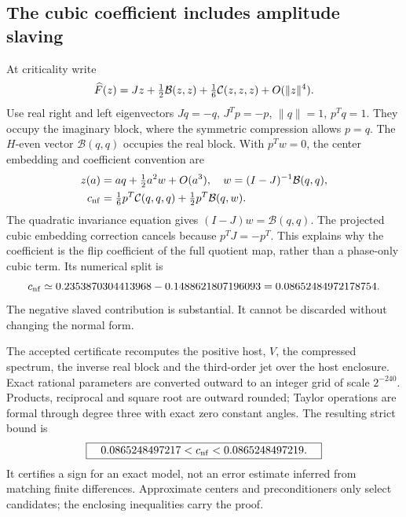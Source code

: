 \documentclass[11pt,a4paper]{article}
\begin{document}
\subsection{The cubic coefficient includes amplitude slaving}
At criticality write
\begin{equation}
 \widehat F(z)=Jz+\tfrac12\mathcal B(z,z)+\tfrac16\mathcal C(z,z,z)+O(\|z\|^4).
\end{equation}
Use real right and left eigenvectors $Jq=-q$, $J^Tp=-p$, $\|q\|=1$, $p^Tq=1$. They occupy the imaginary block, where the symmetric compression allows $p=q$. The $H$-even vector $\mathcal B(q,q)$ occupies the real block. With $p^Tw=0$, the center embedding and coefficient convention are
\begin{align}
 z(a)&=aq+\tfrac12a^2w+O(a^3),\quad w=(I-J)^{-1}\mathcal B(q,q),\\
 c_{\rm nf}&=\tfrac16p^T\mathcal C(q,q,q)+\tfrac12p^T\mathcal B(q,w).\label{eq:cnf}
\end{align}
The quadratic invariance equation gives $(I-J)w=\mathcal B(q,q)$. The projected cubic embedding correction cancels because $p^TJ=-p^T$. This explains why the coefficient is the flip coefficient of the full quotient map, rather than a phase-only cubic term. Its numerical split is
\begin{equation}
 c_{\rm nf}\simeq0.2353870304413968-0.1488621807196093
 =0.08652484972178754.
\end{equation}
The negative slaved contribution is substantial. It cannot be discarded without changing the normal form.

The accepted certificate recomputes the positive host, $V$, the compressed spectrum, the inverse real block and the third-order jet over the host enclosure. Exact rational parameters are converted outward to an integer grid of scale $2^{-240}$. Products, reciprocal and square root are outward rounded; Taylor operations are formal through degree three with exact zero constant angles. The resulting strict bound is
\begin{equation}\boxed{\quad0.0865248497217<c_{\rm nf}<0.0865248497219.\quad}\label{eq:cinterval}\end{equation}
It certifies a sign for an exact model, not an error estimate inferred from matching finite differences. Approximate centers and preconditioners only select candidates; the enclosing inequalities carry the proof.
\end{document}
